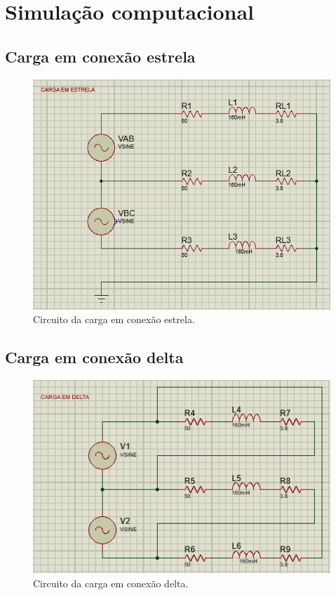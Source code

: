 \documentclass[a4paper,12pt,oneside,openany,table,xcdraw]{article}
\begin{document}
\newpage
\section{Simulação computacional} %
\subsection{Carga em conexão estrela}
\begin{figure}[H]
\centering
\captionsetup{font=scriptsize}
\includegraphics[width=14cm]{sim1}
\caption{Circuito da carga em conexão estrela.}
\label{sim1}
\end{figure}

\subsection{Carga em conexão delta}
\begin{figure}[H]
\centering
\captionsetup{font=scriptsize}
\includegraphics[width=14cm]{sim2}
\caption{Circuito da carga em conexão delta.}
\label{sim2}
\end{figure}
\end{document}
